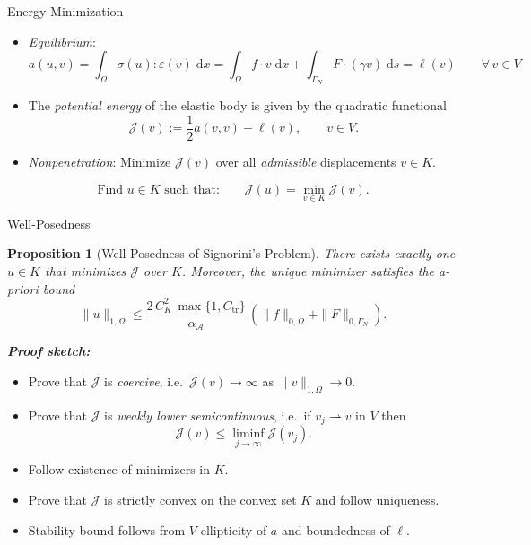 \documentclass[10pt,aspectratio=169]{beamer}
\newtheorem{proposition}{Proposition}[section]
\def\cA{{\mathcal A}}
\def\cJ{{\mathcal J}}
\def\d{{\mathrm{d}}}
\def\dx{{\d x}}
\def\ds{{\d s}}
\begin{document}
\begin{frame}{Energy Minimization}
	\begin{itemize}
		\item {\em Equilibrium}:
		      \begin{equation*}
			      a(u,v) = \int_\Omega \sigma(u):\varepsilon(v)\;\dx = \int_\Omega f\cdot v\;\dx +\int_{\Gamma_N} F\cdot(\gamma v)\;\ds = \ell(v)\qquad \forall\, v\in V
		      \end{equation*}
		\item The {\em potential energy} of the elastic body is given by the quadratic functional
		      \begin{equation*}
			      \cJ(v):= \frac{1}{2}a(v,v)-\ell(v),\qquad v\in V.
		      \end{equation*}
		\item {\em Nonpenetration}: Minimize $\cJ(v)$ over all {\em admissible} displacements $v\in K$.
	\end{itemize}

	\begin{problem}
	\begin{equation*}
		\text{Find }u\in K\text{ such that:}\qquad \cJ(u) = \min_{v\in K}\cJ(v).
	\end{equation*}
	\end{problem}
\end{frame}

\begin{frame}{Well-Posedness}
	\begin{proposition}[Well-Posedness of Signorini's Problem]
		There exists exactly one $u\in K$ that minimizes $\cJ$ over $K$. Moreover, the unique minimizer satisfies the a-priori bound
		\begin{equation*}
			\|u\|_{1,\Omega} \le \frac{2\,C_K^2\,\max\{1,C_\mathrm{tr}\}}{\alpha_\cA}\,\left(\|f\|_{0,\Omega} +\|F\|_{0,\Gamma_N}\right).
		\end{equation*}
	\end{proposition}
	\textbf{\em Proof sketch:}
	\begin{itemize}
		\item Prove that $\cJ$ is {\em coercive}, i.e.\ $\cJ(v)\to\infty$ as $\|v\|_{1,\Omega}\to 0$.
		\item Prove that $\cJ$ is {\em weakly lower semicontinuous}, i.e.\ if $v_j \rightharpoonup v$ in $V$ then
		      \begin{equation*}
			      \cJ(v)\le\liminf_{j\to\infty}\cJ(v_j).
		      \end{equation*}
		\item Follow existence of minimizers in $K$.
		\item Prove that $\cJ$ is strictly convex on the convex set $K$ and follow uniqueness.
		\item Stability bound follows from $V$-ellipticity of $a$ and boundedness of $\ell$.
	\end{itemize}
\end{frame}
\end{document}
